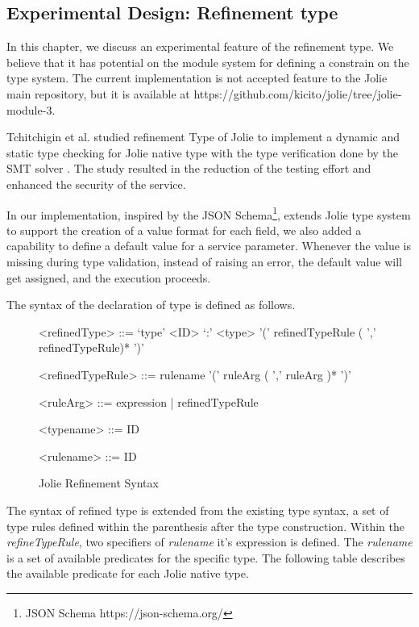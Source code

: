 \subsection{Experimental Design: Refinement type}

In this chapter, we discuss an experimental feature of the refinement type. We believe that it has potential on the module system for defining a constrain on the type system. The current implementation is not accepted feature to the Jolie main repository, but it is available at https://github.com/kicito/jolie/tree/jolie-module-3.

Tchitchigin et al. studied refinement Type of Jolie to implement a dynamic and static type checking for Jolie native type with the type verification done by the SMT solver \cite{DBLP:journals/corr/TchitchiginSMEM16}. The study resulted in the reduction of the testing effort and enhanced the security of the service.

In our implementation, inspired by the JSON Schema\footnote{JSON Schema https://json-schema.org/}, extends Jolie type system to support the creation of a value format for each field, we also added a capability to define a default value for a service parameter. Whenever the value is missing during type validation, instead of raising an error, the default value will get assigned, and the execution proceeds.

The syntax of the declaration of type is defined as follows.

\begin{figure}[ht]
    \begin{framed}
        \begin{grammar}
            <refinedType> ::= `type' <ID> `:' <type>  '(' refinedTypeRule ( ',' refinedTypeRule)* ')'
            
            <refinedTypeRule> ::= rulename '(' ruleArg ( ',' ruleArg )* ')'
            
            <ruleArg> ::= expression | refinedTypeRule
            
            <typename> ::= ID
            
            <rulename> ::= ID
        \end{grammar}
    \end{framed}
    \caption{Jolie Refinement Syntax}
    \label{fig:JolieRefinementGrammar}
\end{figure}

The syntax of refined type is extended from the existing type syntax, a set of type rules defined within the parenthesis after the type construction. Within the \textit{refineTypeRule}, two specifiers of \textit{rulename} it's expression is defined. The \textit{rulename} is a set of available predicates for the specific type. The following table describes the available predicate for each Jolie native type.

